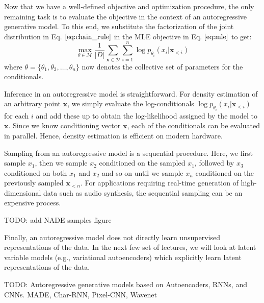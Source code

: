 Now that we have a well-defined objective and optimization procedure, the only remaining task is to evaluate the objective in the context of an autoregressive generative model. To this end, we substitute the factorization of the joint distribution in Eq.$~\ref{eq:chain_rule}$
in the MLE objective in Eq.$~\ref{eq:mle}$ to get:
\[
\max_{\theta \in \mathcal{M}}\frac{1}{\vert D \vert} \sum_{\mathbf{x} \in\mathcal{D} }\sum_{i=1}^n\log p_{\theta_i}(x_i \vert \mathbf{x}_{<i})
\]where $\theta = \{\theta_1, \theta_2, \ldots, \theta_n\}$ now denotes the collective set of parameters for the conditionals.

Inference in an autoregressive model is straightforward. For density estimation of an arbitrary point $\mathbf{x}$, we simply evaluate the log-conditionals $\log p_{\theta_i}(x_i \vert \mathbf{x}_{<i})$ for each $i$ and add these up to obtain the log-likelihood assigned by the model to $\mathbf{x}$. Since we know conditioning vector $\mathbf{x}$, each of the conditionals can be evaluated in parallel. Hence, density estimation is efficient on modern hardware.

Sampling from an autoregressive model is a sequential procedure. Here, we first sample $x_1$, then we sample $x_2$ conditioned on the sampled $x_1$, followed by $x_3$ conditioned on both $x_1$ and $x_2$ and so on until we sample $x_n$ conditioned on the previously sampled $\mathbf{x}_{<n}$. For applications requiring real-time generation of high-dimensional data such as audio synthesis, the sequential sampling can be an expensive process.


TODO: add NADE samples figure

Finally, an autoregressive model does not directly learn unsupervised representations of the data. In the next few set of lectures, we will look at latent variable models (e.g., variational autoencoders) which explicitly learn latent representations of the data.


TODO: Autoregressive generative models based on Autoencoders, RNNs, and CNNs.
MADE, Char-RNN, Pixel-CNN, Wavenet
